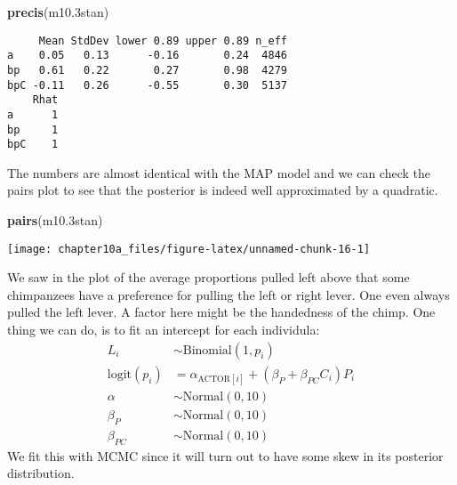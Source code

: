 \documentclass[]{tufte-handout}
\newenvironment{Shaded}{}{}
\newcommand{\KeywordTok}[1]{\textcolor[rgb]{0.00,0.44,0.13}{\textbf{#1}}}
\newcommand{\FloatTok}[1]{\textcolor[rgb]{0.25,0.63,0.44}{#1}}
\newcommand{\NormalTok}[1]{#1}
\begin{document}
\begin{Shaded}
\begin{Highlighting}[]
\KeywordTok{precis}\NormalTok{(m10}\FloatTok{.3}\NormalTok{stan)}
\end{Highlighting}
\end{Shaded}

\begin{verbatim}
     Mean StdDev lower 0.89 upper 0.89 n_eff
a    0.05   0.13      -0.16       0.24  4846
bp   0.61   0.22       0.27       0.98  4279
bpC -0.11   0.26      -0.55       0.30  5137
    Rhat
a      1
bp     1
bpC    1
\end{verbatim}

The numbers are almost identical with the MAP model and we can check the
pairs plot to see that the posterior is indeed well approximated by a
quadratic.

\begin{Shaded}
\begin{Highlighting}[]
\KeywordTok{pairs}\NormalTok{(m10}\FloatTok{.3}\NormalTok{stan)}
\end{Highlighting}
\end{Shaded}

\texttt{[image: chapter10a\_files/figure-latex/unnamed-chunk-16-1]}

We saw in the plot of the average proportions pulled left above that
some chimpanzees have a preference for pulling the left or right lever.
One even always pulled the left lever. A factor here might be the
handedness of the chimp. One thing we can do, is to fit an intercept for
each individula: \[\begin{align*}
L_i &\sim \text{Binomial}(1, p_i)\\
\text{logit}(p_i) &= \alpha_{\text{ACTOR}[i]} + (\beta_P + \beta_{PC}C_i)P_i \\
\alpha &\sim \text{Normal}(0, 10) \\
\beta_P &\sim \text{Normal}(0, 10) \\
\beta_{PC} &\sim \text{Normal}(0, 10) 
\end{align*}\] We fit this with MCMC since it will turn out to have some
skew in its posterior distribution.
\end{document}
